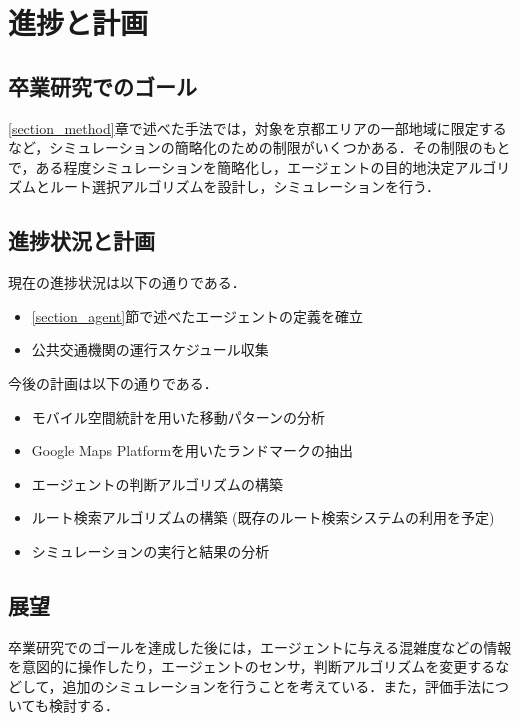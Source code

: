 \section{進捗と計画}
\subsection{卒業研究でのゴール}
\ref{section_method}章で述べた手法では，対象を京都エリアの一部地域に限定するなど，シミュレーションの簡略化のための制限がいくつかある．その制限のもとで，ある程度シミュレーションを簡略化し，エージェントの目的地決定アルゴリズムとルート選択アルゴリズムを設計し，シミュレーションを行う．

\subsection{進捗状況と計画}
現在の進捗状況は以下の通りである．
\begin{itemize}
  \item \ref{section_agent}節で述べたエージェントの定義を確立
  \item 公共交通機関の運行スケジュール収集
\end{itemize}

今後の計画は以下の通りである．
\begin{itemize}
  \item モバイル空間統計を用いた移動パターンの分析
  \item Google Maps Platformを用いたランドマークの抽出
  \item エージェントの判断アルゴリズムの構築
  \item ルート検索アルゴリズムの構築 (既存のルート検索システムの利用を予定)
  \item シミュレーションの実行と結果の分析
\end{itemize}

\subsection{展望}
卒業研究でのゴールを達成した後には，エージェントに与える混雑度などの情報を意図的に操作したり，エージェントのセンサ，判断アルゴリズムを変更するなどして，追加のシミュレーションを行うことを考えている．また，評価手法についても検討する．
